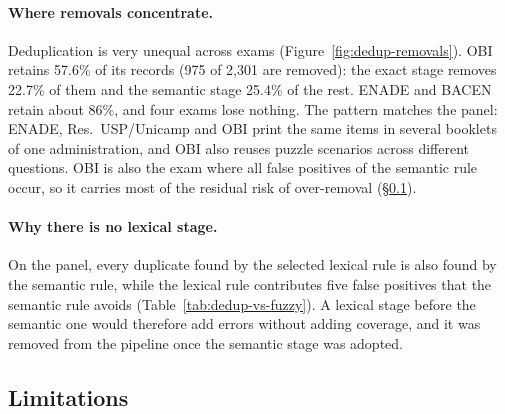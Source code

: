 \paragraph{Where removals concentrate.} Deduplication is very unequal across
exams (Figure~\ref{fig:dedup-removals}). OBI retains 57.6\% of its records
(975 of 2,301 are removed): the exact stage removes 22.7\% of them and the
semantic stage 25.4\% of the rest. ENADE and BACEN retain about 86\%, and
four exams lose nothing. The pattern matches the panel: ENADE,
Res.\ USP/Unicamp and OBI print the same items in several booklets of one
administration, and OBI also reuses puzzle scenarios across different
questions. OBI is also the exam where all false positives of the semantic
rule occur, so it carries most of the residual risk of over-removal
(\S\ref{app:dedup-limitations}).

\paragraph{Why there is no lexical stage.} On the panel, every duplicate
found by the selected lexical rule is also found by the semantic rule, while
the lexical rule contributes five false positives that the semantic rule
avoids (Table~\ref{tab:dedup-vs-fuzzy}). A lexical stage before the semantic
one would therefore add errors without adding coverage, and it was removed
from the pipeline once the semantic stage was adopted.

\subsection{Limitations}
\label{app:dedup-limitations}

